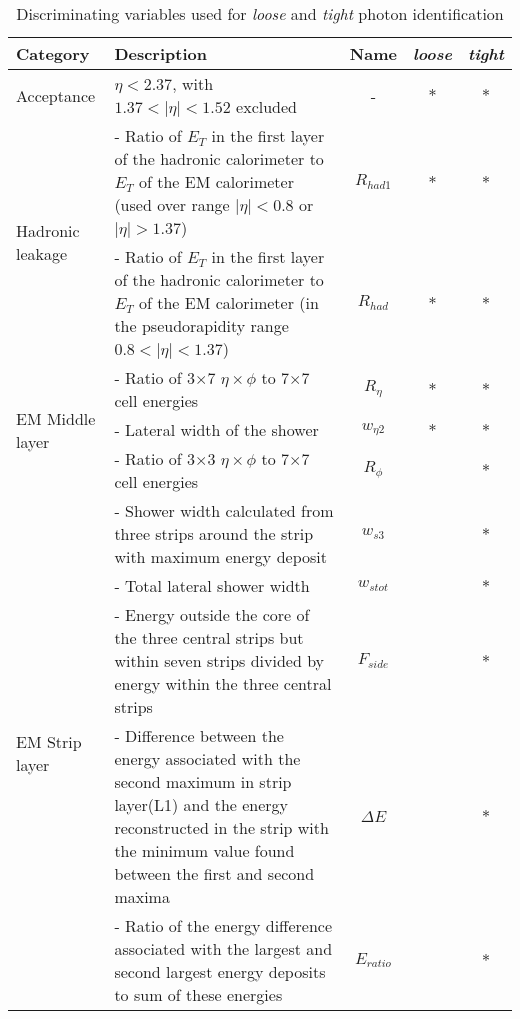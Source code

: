 \documentclass[a4paper, oneside, 11pt, openright]{book}
\begin{document}
				\begin{center}
					\begin{table}
						\centering
						\begin{tabular}{lp{6cm}ccc}
							\toprule[1.5pt]
							\textbf{Category} & \textbf{Description} & \textbf{Name} & \textbf{\textit{loose}} & \textbf{\textit{tight}}\\
							\midrule
							Acceptance & $\eta<2.37$, with $1.37<|\eta|<1.52$ excluded & - & $\ast$ & $\ast$ \\
							\midrule
							\multirow[t]{2}{*}{Hadronic leakage} 
							& {- Ratio of $E_T$ in the first layer of the hadronic calorimeter to $E_T$ of the EM calorimeter (used over range $|\eta| < 0.8$ or $|\eta| > 1.37$)} & $R_{had1}$ & $\ast$ & $\ast$  \\ 
							& - Ratio of $E_T$ in the first layer of the hadronic calorimeter to $E_T$ of the EM calorimeter (in the pseudorapidity range $0.8 < |\eta| < 1.37$) & $R_{had}$  & $\ast$ & $\ast$ \\
							\midrule
							\multirow[t]{3}{*}{EM Middle layer}
							& - Ratio of 3$\times$7 $\eta\times\phi$ to 7$\times$7 cell energies & $R_{\eta}$ & $\ast$ & $\ast$ \\
							& - Lateral width of the shower & $w_{\eta2}$ & $\ast$ & $\ast$ \\
							& - Ratio of 3$\times$3 $\eta\times\phi$ to 7$\times$7 cell energies & $R_{\phi}$ &  & $\ast$ \\
							\midrule
							\multirow[t]{5}{*}{EM Strip layer}
							& - Shower width calculated from three strips around the strip with maximum energy deposit & $w_{s3}$ &  & $\ast$ \\
							& - Total lateral shower width & $w_{stot}$ &  & $\ast$ \\
							& - Energy outside the core of the three central strips but within seven strips divided by energy within the three central strips & $F_{side}$ &  & $\ast$ \\
							& - Difference between the energy associated with the second maximum in strip layer(L1) and the energy reconstructed in the strip with the minimum value found between the first and second maxima & $\Delta E$ &  & $\ast$ \\
							& - Ratio of the energy difference associated with the largest and second largest energy deposits to sum of these energies & $E_{ratio}$ &  & $\ast$ \\
							\bottomrule
						\end{tabular}
						\caption{Discriminating variables used for \textit{loose} and \textit{tight} photon identification \cite{ph_id}}
						\label{tab:ph parameters}
					\end{table}
				\end{center}
						
\end{document}
